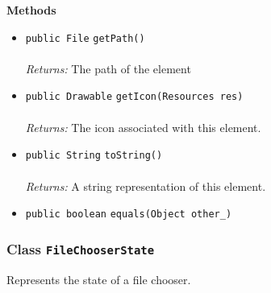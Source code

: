 \textbf{\sffamily Methods}
\begin{itemize}
\item \lstinline|public File| \lstinline|getPath|\lstinline|()|\\ \\[-0.6em]
\emph{Returns:} The path of the element



\item \lstinline|public Drawable| \lstinline|getIcon|\lstinline|(Resources res)|\\ \\[-0.6em]
\emph{Returns:} The icon associated with this element.



\item \lstinline|public String| \lstinline|toString|\lstinline|()|\\ \\[-0.6em]
\emph{Returns:} A string representation of this element.



\item \lstinline|public boolean| \lstinline|equals|\lstinline|(Object other_)| \\[-0.6em]




\end{itemize}

\subsubsection{Class \lstinline|FileChooserState|}
Represents the state of a file chooser. \\
\noindent\begin{minipage}[t]{5cm}
\vspace{0.3em}
\hspace*{2em}
\vspace{0.3em}
\end{minipage}




